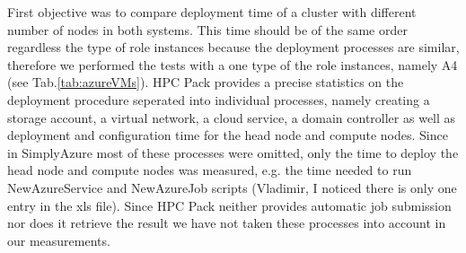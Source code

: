 \documentclass[3p,times]{elsarticle}
\begin{document}
First objective was to compare deployment time of a cluster with different number of nodes in both systems. This time should be of the same order regardless the type of role instances because the deployment processes are similar, therefore we performed the tests with a one type of the role instances, namely A4 (see Tab.\ref{tab:azureVMs}). HPC Pack provides a precise statistics on the deployment procedure seperated into individual processes, namely creating a storage account, a virtual network, a cloud service, a domain controller as well as  deployment and configuration time for the head node and compute nodes. Since in SimplyAzure most of these processes were omitted, only the time to deploy the head node and compute nodes was measured, e.g. the time needed to run NewAzureService and NewAzureJob scripts (\textcolor[rgb]{1,0,0}{Vladimir, I noticed there is only one entry in the xls file}). Since HPC Pack neither provides automatic job submission nor does it retrieve the result we have not taken these processes into account in our measurements. 

\end{document}
